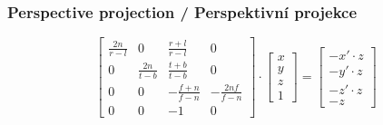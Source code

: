 \begin{frame}
\frametitle{Perspective projection / Perspektivní projekce}
{\tiny
\begin{equation}
\left[
\begin{array}{cccc} 
\frac{2n}{r-l} & 0               & \frac{r+l}{r-l} & 0 \\
0               & \frac{2n}{t-b} & \frac{t+b}{t-b} & 0 \\
0               & 0               & -\frac{f+n}{f-n} & -\frac{2nf}{f-n} \\
0               & 0               & -1                & 0
\end{array}
\right]
\cdot
\left[
\begin{array}{c}
x \\
y \\
z \\
1
\end{array}
\right]
=
\left[
\begin{array}{c}
-x'\cdot z \\
-y'\cdot z \\
-z'\cdot z \\
-z
\end{array}
\right]
\end{equation}
}
\end{frame}

